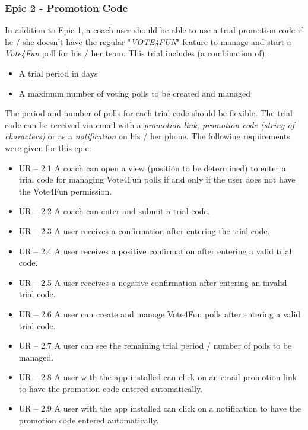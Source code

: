 \subsubsection{Epic 2 - Promotion Code}
\label{sssec:epic2}
In addition to Epic 1, a coach user should be able to use a trial promotion code if he / she doesn't have the regular "\textit{VOTE4FUN}" feature to manage and start a \textit{Vote4Fun} poll for his / her team. 
\newline
This trial includes (a combination of):
\begin{itemize}
    \item A trial period in days
    \item A  maximum number of  voting polls to be created and managed
\end{itemize}
The period and number of polls for each trial code should be flexible. 
\newline
The trial code can be received via email with a \textit{promotion link, promotion code (string of characters)} or as a \textit{notification} on his /  her phone. 
\newline
\newline
The following requirements were given for this epic:
\begin{itemize}
    \item UR – 2.1 
    \newline
    A coach can open a view (position to be determined) to enter a trial code for managing Vote4Fun polls if and only if the user does not have the Vote4Fun permission.
    \item UR – 2.2
    \newline
    A coach can enter and submit a trial code.
    \item UR – 2.3 
    \newline
    A user receives a confirmation after entering the trial code.
    \item UR – 2.4 
    \newline
    A user receives a positive confirmation after entering a valid trial code.
    \item UR – 2.5 
    \newline
    A user receives a negative confirmation after entering an invalid trial code.
    \item UR – 2.6
    \newline
    A user can create and manage Vote4Fun polls after entering a valid trial code.
    \item UR – 2.7 
    \newline
    A user can see the remaining trial period / number of polls to be managed.
    \item UR – 2.8
    \newline
    A user with the app installed can click on an email promotion link to have the promotion code entered automatically.
    \item UR – 2.9 
    \newline
    A user with the app installed can click on a notification to have the promotion code entered automatically.
\end{itemize}

